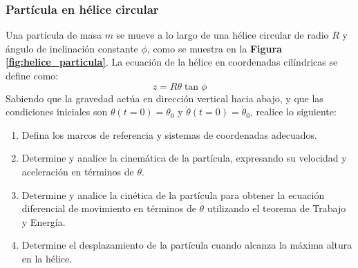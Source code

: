 \subsubsection{Partícula en hélice circular}

Una partícula de masa $m$ se mueve a lo largo de una hélice circular de radio $R$ y ángulo de inclinación constante $\phi$, como se muestra en la \textbf{Figura \ref{fig:helice_particula}}. La ecuación de la hélice en coordenadas cilíndricas se define como:
\begin{equation}
    z = R \theta \tan \phi
\end{equation}
Sabiendo que la gravedad actúa en dirección vertical hacia abajo, y que las condiciones iniciales son $\theta(t=0)=\theta_0$ y $\dot{\theta}(t=0)=\dot{\theta}_0$, realice lo siguiente:

\begin{enumerate}
    \item Defina los marcos de referencia y sistemas de coordenadas adecuados.
    \item Determine y analice la cinemática de la partícula, expresando su velocidad y aceleración en términos de $\theta$.
    \item Determine y analice la cinética de la partícula para obtener la ecuación diferencial de movimiento en términos de $\theta$ utilizando el teorema de Trabajo y Energía.
    \item Determine el desplazamiento de la partícula cuando alcanza la máxima altura en la hélice.
\end{enumerate}

